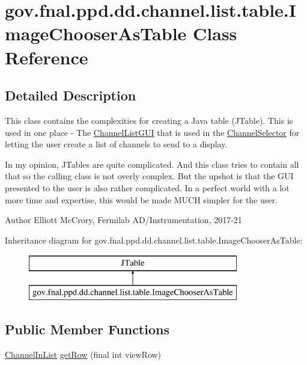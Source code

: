 \hypertarget{classgov_1_1fnal_1_1ppd_1_1dd_1_1channel_1_1list_1_1table_1_1ImageChooserAsTable}{\section{gov.\-fnal.\-ppd.\-dd.\-channel.\-list.\-table.\-Image\-Chooser\-As\-Table Class Reference}
\label{classgov_1_1fnal_1_1ppd_1_1dd_1_1channel_1_1list_1_1table_1_1ImageChooserAsTable}
}


\subsection{Detailed Description}
This class contains the complexities for creating a Java table (J\-Table). This is used in one place -\/ The \hyperlink{classgov_1_1fnal_1_1ppd_1_1dd_1_1channel_1_1list_1_1ChannelListGUI}{Channel\-List\-G\-U\-I} that is used in the \hyperlink{classgov_1_1fnal_1_1ppd_1_1dd_1_1ChannelSelector}{Channel\-Selector} for letting the user create a list of channels to send to a display.

In my opinion, J\-Tables are quite complicated. And this class tries to contain all that so the calling class is not overly complex. But the upshot is that the G\-U\-I presented to the user is also rather complicated. In a perfect world with a lot more time and expertise, this would be made M\-U\-C\-H simpler for the user.

\begin{DoxyAuthor}{Author}
Elliott Mc\-Crory, Fermilab A\-D/\-Instrumentation, 2017-\/21 
\end{DoxyAuthor}
Inheritance diagram for gov.\-fnal.\-ppd.\-dd.\-channel.\-list.\-table.\-Image\-Chooser\-As\-Table\-:\begin{figure}[H]
\begin{center}
\leavevmode
\includegraphics[height=2.000000cm]{classgov_1_1fnal_1_1ppd_1_1dd_1_1channel_1_1list_1_1table_1_1ImageChooserAsTable}
\end{center}
\end{figure}
\subsection*{Public Member Functions}
\begin{DoxyCompactItemize}
\item 
\hyperlink{interfacegov_1_1fnal_1_1ppd_1_1dd_1_1channel_1_1ChannelInList}{Channel\-In\-List} \hyperlink{classgov_1_1fnal_1_1ppd_1_1dd_1_1channel_1_1list_1_1table_1_1ImageChooserAsTable_a9f26ba4f35ca09da14792b4b8b05c94e}{get\-Row} (final int view\-Row)
\end{DoxyCompactItemize}


